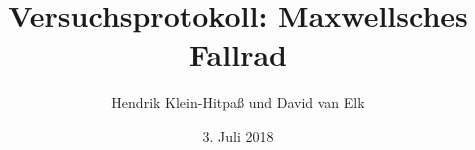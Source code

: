 \documentclass[ngerman,
    paper=a4,
    ]{article}
\title{Versuchsprotokoll: Maxwellsches Fallrad}
\author{Hendrik Klein-Hitpaß und David van Elk}
\date{3. Juli 2018}
\begin{document}
    \maketitle
    \tableofcontents
    \pagebreak

    
    
    
    
    
    
    
\end{document}
